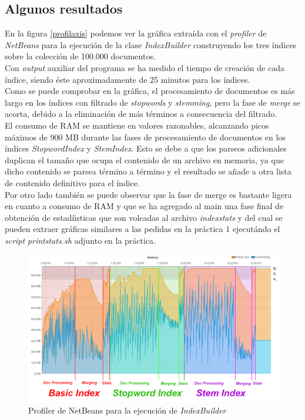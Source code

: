 \documentclass[spanish]{assignment}
\begin{document}
	\subsection{Algunos resultados}
	En la figura \ref{profilaxis} podemos ver la gráfica extraída con el \textit{profiler} de \textit{NetBeans} para la ejecución de la clase \textit{IndexBuilder} construyendo los tres índices sobre la colección de 100.000 documentos.\\
	
	Con \textit{output} auxiliar del programa se ha medido el tiempo de creación de cada índice, siendo éste aproximadamente de 25 minutos para los índices.\\
	
	Como se puede comprobar en la gráfica, el procesamiento de documentos es más largo en los índices con filtrado de \textit{stopwords} y \textit{stemming}, pero la fase de \textit{merge} se acorta, debido a la eliminación de más términos a consecuencia del filtrado.\\
	
	El consumo de RAM se mantiene en valores razonables, alcanzando picos máximos de 900 MB durante las fases de procesamiento de documentos en los índices \textit{StopwordIndex} y \textit{StemIndex}. Esto se debe a que los parseos adicionales duplican el tamaño que ocupa el contenido de un archivo en memoria, ya que dicho contenido se parsea término a término y el resultado se añade a otra lista de contenido definitivo para el índice.\\
	
	Por otro lado también se puede observar que la fase de merge es bastante ligera en cuanto a consumo de RAM y que se ha agregado al main una fase final de obtención de estadíisticas que son volcadas al archivo \textit{indexstats} y del cual se pueden extraer gráficas similares a las pedidas en la práctica 1 ejecutándo el \textit{script} \textit{printstats.sh} adjunto en la práctica.

	\begin{landscape}\label{profilaxis}
		\begin{figure}
			\centering
			\includegraphics[width=1.8\textwidth]{profilaxis.png}
			\caption{Profiler de NetBeans para la ejecución de \textit{IndexBuilder}}
		\end{figure}
	\end{landscape}
	
\end{document}
